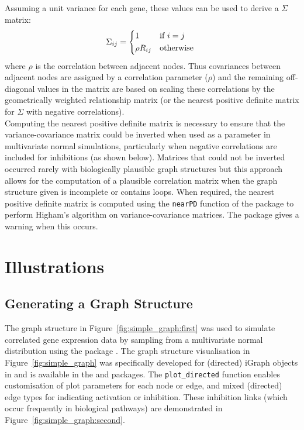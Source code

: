 \documentclass[article, shortnames]{jss}
\begin{document}
Assuming a unit variance for each gene, these values can be used to derive a $\Sigma$ matrix:
%
\[
\Sigma_{ij} = 
\begin{dcases*}
   1                            & if $i=j$ \\
   \rho R_{ij}  & otherwise
\end{dcases*}
\]
%
\noindent
where $\rho$ is the correlation between adjacent nodes. 
Thus covariances between adjacent nodes are assigned by a correlation parameter ($\rho$) and the remaining off-diagonal values in the matrix are based on scaling these correlations by the geometrically weighted relationship matrix (or the nearest positive definite matrix for $\Sigma$ with negative correlations).\\

Computing the nearest positive definite matrix is necessary to ensure that the variance-covariance matrix could be inverted when used as a parameter in multivariate normal simulations, particularly when negative correlations are included for inhibitions (as shown below). Matrices that could not be inverted occurred rarely with biologically plausible graph structures but this approach allows for the computation of a plausible correlation matrix when the graph structure given is incomplete or contains loops. When required, the nearest positive definite matrix is computed using the \texttt{nearPD} function of the   package \citep{Matrix} to perform Higham's algorithm \citep{Higham2002} on variance-covariance matrices. The  package gives a warning when this occurs.

\section{Illustrations} \label{sec:illustrations}
\subsection{Generating a Graph Structure} \label{sec:plot_graph}

The graph structure in Figure~\ref{fig:simple_graph:first} was used to simulate correlated gene expression data by sampling from a multivariate normal distribution using the   package \citep{Genz2009, mvtnorm}.
The graph structure visualisation in Figure~\ref{fig:simple_graph} was specifically developed for (directed) iGraph objects in  and is available in the  and  packages. The \texttt{plot\_directed} function enables customisation of plot parameters for each node or edge, and mixed (directed) edge types for indicating activation or inhibition. These inhibition links (which occur frequently in biological pathways) are demonstrated in Figure~\ref{fig:simple_graph:second}.
\end{document}
